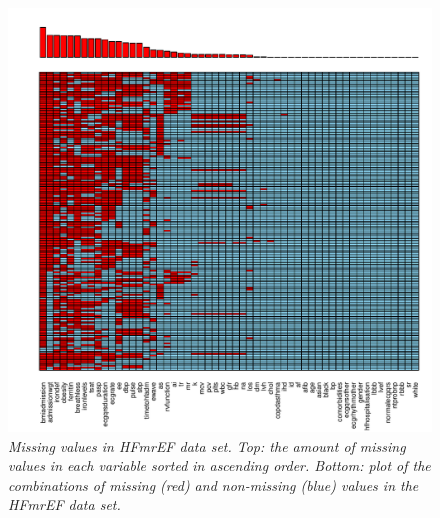 \documentclass[../thesis.tex]{subfiles}
\begin{document}
\newpage

\begin{figure}[h!]
    \centering
    \hspace*{-1cm}\includegraphics[width=1.1\textwidth]{doc/thesis/images/HFmrEF_miss_dist.pdf}
    \caption[Missing values in HFmrEF data set]{\textit{Missing values in HFmrEF data set. Top:  the amount of missing values in each variable sorted in ascending order. Bottom: plot of the combinations of missing (red) and non-missing (blue) values in the HFmrEF data set.}}
    \label{fig:HFmrEF_missing}
\end{figure}

\newpage
\end{document}
